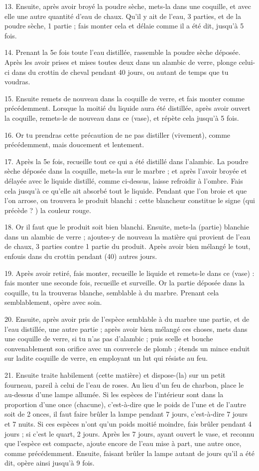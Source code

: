 \documentclass[a4paper, 11pt, oneside, polutonikogreek, french]{article}
\begin{document}
13. Ensuite, après avoir broyé la poudre sèche, mets-la dans une coquille, et avec elle une autre quantité d'eau de chaux. Qu'il y ait de l'eau, 3 parties, et de la poudre sèche, 1 partie ; fais monter cela et délaie comme il a été dit, jusqu'à 5 fois.

14. Prenant la 5e fois toute l'eau distillée, rassemble la poudre sèche déposée. Après les avoir prises et mises toutes deux dans un alambic de verre, plonge celui-ci dans du crottin de cheval pendant 40 jours, ou autant de temps que tu voudras.

15. Ensuite remets de nouveau dans la coquille de verre, et fais monter comme précédemment. Lorsque la moitié du liquide aura été distillée, après avoir ouvert la coquille, remets-le de nouveau dans ce (vase), et répète cela jusqu'à 5 fois.

16. Or tu prendras cette précaution de ne pas distiller (vivement), comme précédemment, mais doucement et lentement.

17. Après la 5e fois, recueille tout ce qui a été distillé dans l'alambic. La poudre sèche déposée dans la coquille, mets-la sur le marbre ; et après l'avoir broyée et délayée avec le liquide distillé, comme ci-dessus, laisse refroidir à l'ombre. Fais cela jusqu'à ce qu'elle ait absorbé tout le liquide. Pendant que l'on broie et que l'on arrose, on trouvera le produit blanchi : cette blancheur constitue le signe (qui précède ? ) la couleur rouge.

18. Or il faut que le produit soit bien blanchi. Ensuite, mets-la (partie) blanchie dans un alambic de verre ; ajoutes-y de nouveau la matière qui provient de l'eau de chaux, 3 parties contre 1 partie du produit. Après avoir bien mélangé le tout, enfouis dans du crottin pendant (40) autres jours.

19. Après avoir retiré, fais monter, recueille le liquide et remets-le dans ce (vase) : fais monter une seconde fois, recueille et surveille. Or la partie déposée dans la coquille, tu la trouveras blanche, semblable à du marbre. Prenant cela semblablement, opère avec soin.

20. Ensuite, après avoir pris de l'espèce semblable à du marbre une partie, et de l'eau distillée, une autre partie ; après avoir bien mélangé ces choses, mets dans une coquille de verre, si tu n'as pas d'alambic ; puis scelle et bouche convenablement son orifice avec un couvercle de plomb ; étends un mince enduit sur ladite coquille de verre, en employant un lut qui résiste au feu.

21. Ensuite traite habilement (cette matière) et dispose-(la) sur un petit fourneau, pareil à celui de l'eau de roses. Au lieu d'un feu de charbon, place le au-dessus d'une lampe allumée. Si les espèces de l'intérieur sont dans la proportion d'une once (chacune), c'est-à-dire que le poids de l'une et de l'autre soit de 2 onces, il faut faire brûler la lampe pendant 7 jours, c'est-à-dire 7 jours et 7 nuits. Si ces espèces n'ont qu'un poids moitié moindre, fais brûler pendant 4 jours ; si c'est le quart, 2 jours. Après les 7 jours, ayant ouvert le vase, et reconnu que l'espèce est compacte, ajoute encore de l'eau mise à part, une autre once, comme précédemment. Ensuite, faisant brûler la lampe autant de jours qu'il a été dit, opère ainsi jusqu'à 9 fois.
\end{document}
